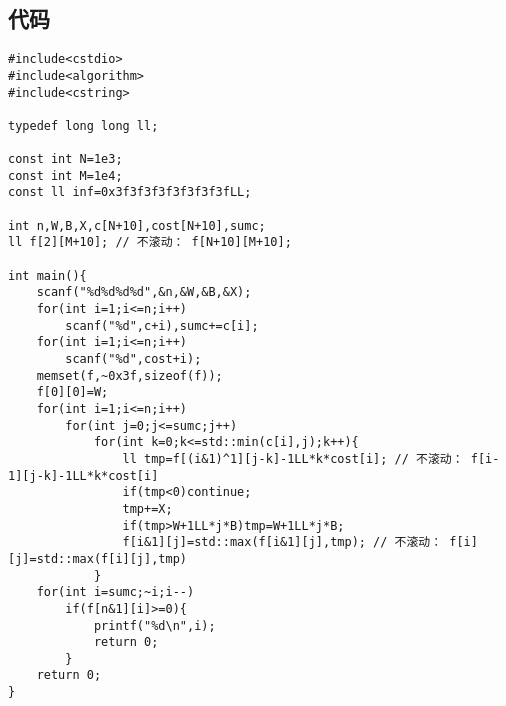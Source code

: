 \documentclass{article}
\begin{document}
	\subsection{代码}

	\begin{lstlisting}
#include<cstdio>
#include<algorithm>
#include<cstring>

typedef long long ll;

const int N=1e3;
const int M=1e4;
const ll inf=0x3f3f3f3f3f3f3f3fLL;

int n,W,B,X,c[N+10],cost[N+10],sumc;
ll f[2][M+10]; // 不滚动： f[N+10][M+10];

int main(){
	scanf("%d%d%d%d",&n,&W,&B,&X);
	for(int i=1;i<=n;i++)
		scanf("%d",c+i),sumc+=c[i];
	for(int i=1;i<=n;i++)
		scanf("%d",cost+i);
	memset(f,~0x3f,sizeof(f));
	f[0][0]=W;
	for(int i=1;i<=n;i++)
		for(int j=0;j<=sumc;j++)
			for(int k=0;k<=std::min(c[i],j);k++){
				ll tmp=f[(i&1)^1][j-k]-1LL*k*cost[i]; // 不滚动： f[i-1][j-k]-1LL*k*cost[i]
				if(tmp<0)continue;
				tmp+=X;
				if(tmp>W+1LL*j*B)tmp=W+1LL*j*B;
				f[i&1][j]=std::max(f[i&1][j],tmp); // 不滚动： f[i][j]=std::max(f[i][j],tmp)
			}
	for(int i=sumc;~i;i--)
		if(f[n&1][i]>=0){
			printf("%d\n",i);
			return 0;
		}
	return 0;
}
	\end{lstlisting}
\end{document}
